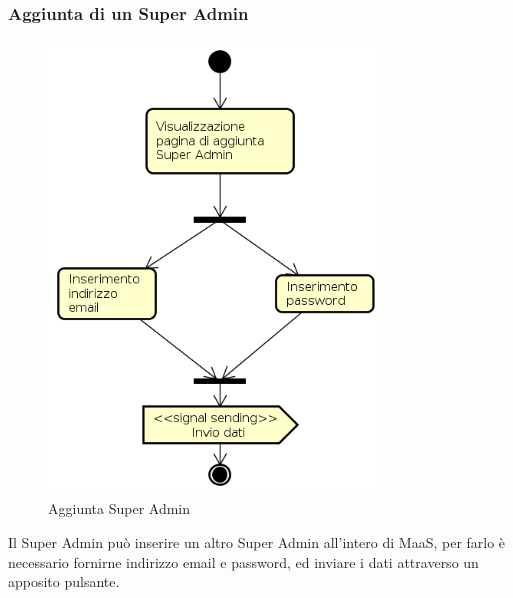 \subsubsection{Aggiunta di un Super Admin}
\begin{figure}[H]
\begin{center}
\includegraphics[height=12cm]{res/sections/backend/activities/aggiuntaSuperAdmin.png}
\caption{Aggiunta Super Admin}
\end{center}
\end{figure}
Il Super Admin può inserire un altro Super Admin all'intero di MaaS, per farlo è necessario fornirne indirizzo email e password, ed inviare i dati attraverso un apposito pulsante.
